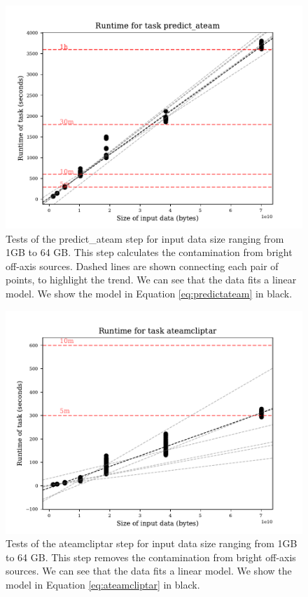 \documentclass[preprint,5p]{elsarticle}
\begin{document}
\begin{figure}
    \includegraphics[width=0.95\linewidth]{figures/predict_ateam_size.pdf}
      \cprotect\caption{Tests of the  {\selectfont predict\_ateam} step for input data size ranging from 1GB to 64 GB. This step calculates the contamination from bright off-axis sources. Dashed lines are shown connecting each pair of points, to highlight the trend. We can see that the data fits a linear model. We show the model in Equation \ref{eq:predictateam} in black. }
	\label{fig:predict_ateam}
\end{figure}


\begin{figure}
    \includegraphics[width=0.95\linewidth]{figures/ateamcliptar_size.pdf}
      \cprotect\caption{Tests of the {\selectfont ateamcliptar} step for input data size ranging from 1GB to 64 GB. This step removes the contamination from bright off-axis sources. We can see that the data fits a linear model. We show the model in Equation \ref{eq:ateamcliptar} in black.}
	\label{fig:ateamcliptar}
\end{figure}
\end{document}
